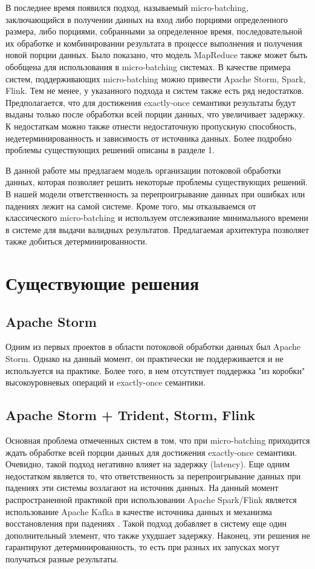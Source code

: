 \documentclass[14pt]{matmex-diploma-custom}
\begin{document}
В последнее время появился подход, называемый micro-batching, заключающийся в получении данных на вход либо порциями определенного размера, либо порциями, собранными за определенное время, последовательной их обработке и комбинировании результата в процессе выполнения и получения новой порции данных. Было показано, что модель MapReduce также может быть обобщена для использования в micro-batching системах. В качестве примера систем, поддерживающих micro-batching можно привести Apache Storm, Spark, Flink. Тем не менее, у указанного подхода и систем также есть ряд недостатков. Предполагается, что для достижения exactly-once  семантики результаты будут выданы только после обработки всей порции данных, что увеличивает задержку. К недостаткам можно также отнести недостаточную пропускную способность, недетерминированность и зависимость от источника данных. Более подробно проблемы существующих решений описаны в разделе 1.

В данной работе мы предлагаем модель организации потоковой обработки данных, которая позволяет решить некоторые проблемы существующих решений. В нашей модели ответственность за перепроигрывание данных при ошибках или падениях лежит на самой системе. Кроме того, мы отказываемся от классического  micro-batching и используем отслеживание минимального времени в системе для выдачи валидных результатов. Предлагаемая архитектура позволяет также добиться детерминированности.

\section{Существующие решения}

\subsection{Apache Storm}

Одним из первых проектов в области потоковой обработки данных был Apache Storm. Однако на данный момент, он практически не поддерживается и не используется на практике. Более того, в нем отсутствует поддержка "из коробки" высокоуровневых операций и exactly-once семантики.

\subsection{Apache Storm + Trident, Storm, Flink}

Основная проблема отмеченных систем в том, что при micro-batching приходится ждать обработке всей порции данных для достижения exactly-once семантики. Очевидно, такой подход негативно влияет на задержку (latency). Еще одним недостатком является то, что ответственность за перепроигрывание данных при падениях эти системы возлагают на источник данных. На данный момент распространенной практикой при использовании Apache Spark/Flink является использование Apache Kafka в качестве источника данных и механизма восстановления при падениях \cite{kafka}. Такой подход добавляет в систему еще один дополнительный элемент, что также ухудшает задержку. Наконец, эти решения не гарантируют детерминированность, то есть при разных их запусках могут получаться разные результаты.
\end{document}
